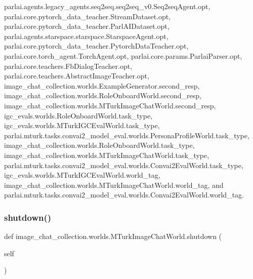 parlai.\+agents.\+legacy\+\_\+agents.\+seq2seq.\+seq2seq\+\_\+v0.\+Seq2seq\+Agent.\+opt, parlai.\+core.\+pytorch\+\_\+data\+\_\+teacher.\+Stream\+Dataset.\+opt, parlai.\+core.\+pytorch\+\_\+data\+\_\+teacher.\+Parl\+A\+I\+Dataset.\+opt, parlai.\+agents.\+starspace.\+starspace.\+Starspace\+Agent.\+opt, parlai.\+core.\+pytorch\+\_\+data\+\_\+teacher.\+Pytorch\+Data\+Teacher.\+opt, parlai.\+core.\+torch\+\_\+agent.\+Torch\+Agent.\+opt, parlai.\+core.\+params.\+Parlai\+Parser.\+opt, parlai.\+core.\+teachers.\+Fb\+Dialog\+Teacher.\+opt, parlai.\+core.\+teachers.\+Abstract\+Image\+Teacher.\+opt, image\+\_\+chat\+\_\+collection.\+worlds.\+Example\+Generator.\+second\+\_\+resp, image\+\_\+chat\+\_\+collection.\+worlds.\+Role\+Onboard\+World.\+second\+\_\+resp, image\+\_\+chat\+\_\+collection.\+worlds.\+M\+Turk\+Image\+Chat\+World.\+second\+\_\+resp, igc\+\_\+evals.\+worlds.\+Role\+Onboard\+World.\+task\+\_\+type, igc\+\_\+evals.\+worlds.\+M\+Turk\+I\+G\+C\+Eval\+World.\+task\+\_\+type, parlai.\+mturk.\+tasks.\+convai2\+\_\+model\+\_\+eval.\+worlds.\+Persona\+Profile\+World.\+task\+\_\+type, image\+\_\+chat\+\_\+collection.\+worlds.\+Role\+Onboard\+World.\+task\+\_\+type, image\+\_\+chat\+\_\+collection.\+worlds.\+M\+Turk\+Image\+Chat\+World.\+task\+\_\+type, parlai.\+mturk.\+tasks.\+convai2\+\_\+model\+\_\+eval.\+worlds.\+Convai2\+Eval\+World.\+task\+\_\+type, igc\+\_\+evals.\+worlds.\+M\+Turk\+I\+G\+C\+Eval\+World.\+world\+\_\+tag, image\+\_\+chat\+\_\+collection.\+worlds.\+M\+Turk\+Image\+Chat\+World.\+world\+\_\+tag, and parlai.\+mturk.\+tasks.\+convai2\+\_\+model\+\_\+eval.\+worlds.\+Convai2\+Eval\+World.\+world\+\_\+tag.

\mbox{\label{classimage__chat__collection_1_1worlds_1_1MTurkImageChatWorld_aace5207ebc6f75d797a87003eeded08d}} 
\subsubsection{\texorpdfstring{shutdown()}{shutdown()}}
{\footnotesize\ttfamily def image\+\_\+chat\+\_\+collection.\+worlds.\+M\+Turk\+Image\+Chat\+World.\+shutdown (\begin{DoxyParamCaption}\item[{}]{self }\end{DoxyParamCaption})}

